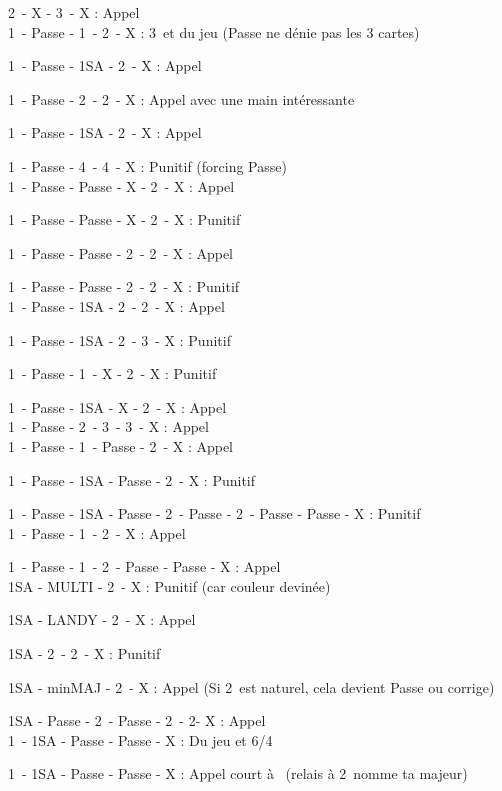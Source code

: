 \documentclass[a4paper, oneside, 11pt]{report}
\begin{document}
		2\pique\ - X - 3\pique\ - X : Appel\\
		
		1\carreau\ - Passe - 1\coeur\ - 2\trefle\ - X : 3\coeur\ et du jeu (Passe ne dénie pas les 3 cartes)
		
		1\pique\ - Passe - 1SA - 2\trefle\ - X : Appel
		
		1\pique\ - Passe - 2\trefle\ - 2\coeur\ - X : Appel avec une main intéressante
		
		1\carreau\ - Passe - 1SA - 2\pique\ - X : Appel
		
		1\coeur\ - Passe - 4\coeur\ - 4\pique\ - X : Punitif (forcing Passe)\\
		
		1\pique\ - Passe - Passe - X - 2\pique\ - X : Appel
		
		1\pique\ - Passe - Passe - X - 2\trefle\ - X : Punitif
		
		1\pique\ - Passe - Passe - 2\coeur\ - 2\pique\ - X : Appel
		
		1\pique\ - Passe - Passe - 2\carreau\ - 2\coeur\ - X : Punitif\\
		
		1\pique\ - Passe - 1SA - 2\coeur\ - 2\pique\ - X : Appel
		
		1\pique\ - Passe - 1SA - 2\coeur\ - 3\carreau\ - X : Punitif
		
		1\carreau\ - Passe - 1\coeur\ - X - 2\carreau\ - X : Punitif
		
		1\carreau\ - Passe - 1SA - X - 2\carreau\ - X : Appel\\
		
		1\coeur\ - Passe - 2\coeur\ - 3\carreau\ - 3\coeur\ - X : Appel\\
		
		1\coeur\ - Passe - 1\pique\ - Passe - 2\coeur\ - X : Appel
		
		1\coeur\ - Passe - 1SA - Passe - 2\coeur\ - X : Punitif
		
		1\coeur\ - Passe - 1SA - Passe - 2\trefle\ - Passe - 2\coeur\ - Passe - Passe - X : Punitif\\
		
		1\carreau\ - Passe - 1\coeur\ - 2\coeur\ - X : Appel
		
		1\carreau\ - Passe - 1\coeur\ - 2\coeur\ - Passe - Passe - X : Appel\\
		
		1SA - MULTI - 2\coeur\ - X : Punitif (car couleur devinée)
		
		1SA - LANDY - 2\carreau\ - X : Appel
		
		1SA - 2\coeur\ - 2\pique\ - X : Punitif
		
		1SA - minMAJ - 2\trefle\ - X : Appel (Si 2\trefle\ est naturel, cela devient Passe ou corrige)
		
		1SA - Passe - 2\carreau\ - Passe - 2\coeur\ - 2\pique - X : Appel\\
		
		
		
		1\coeur\ - 1SA - Passe - Passe - X : Du jeu et 6\coeur/4\pique
		
		1\trefle\ - 1SA - Passe - Passe - X : Appel court à \carreau\ (relais à 2\carreau\ nomme ta majeur)
\end{document}
